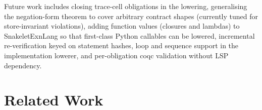 \documentclass[11pt,a4paper]{article}
\begin{document}
Future work includes closing trace-cell obligations in the lowering,
generalising the negation-form theorem to cover arbitrary contract
shapes (currently tuned for store-invariant violations), adding
function values (closures and lambdas) to SnakeletExnLang so that
first-class Python callables can be lowered, incremental
re-verification keyed on statement hashes, loop and sequence support
in the implementation lowerer, and per-obligation coqc validation
without LSP dependency.

\section{Related Work}\label{sec:related}
\end{document}
